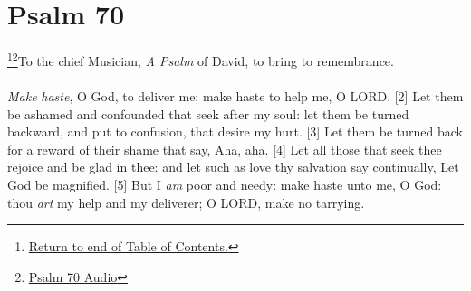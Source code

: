 \chapter{Psalm 70}






\footnote{\textcolor[rgb]{0.00,0.25,0.00}{\hyperlink{TOC}{Return to end of Table of Contents.}}}\footnote{\href{https://audiobible.com/bible/psalms_70.html}{\textcolor[cmyk]{0.99998,1,0,0}{Psalm 70 Audio}}}\textcolor[cmyk]{0.99998,1,0,0}{To the chief Musician, \emph{A Psalm} of David, to bring to remembrance.}\\
\\
\textcolor[cmyk]{0.99998,1,0,0}{\emph{Make} \emph{haste}, O God, to deliver me; make haste to help me, O LORD.}
[2] \textcolor[cmyk]{0.99998,1,0,0}{Let them be ashamed and confounded that seek after my soul: let them be turned backward, and put to confusion, that desire my hurt.}
[3] \textcolor[cmyk]{0.99998,1,0,0}{Let them be turned back for a reward of their shame that say, Aha, aha.}
[4] \textcolor[cmyk]{0.99998,1,0,0}{Let all those that seek thee rejoice and be glad in thee: and let such as love thy salvation say continually, Let God be magnified.}
[5] \textcolor[cmyk]{0.99998,1,0,0}{But I \emph{am} poor and needy: make haste unto me, O God: thou \emph{art} my help and my deliverer; O LORD, make no tarrying.}






